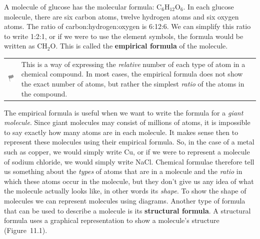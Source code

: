 \begin{enumerate}[noitemsep, label=\textbf{\arabic*}. ]
A molecule of glucose has the molecular formula:
${\mathrm{C}}_{6}{\mathrm{H}}_{12}{\mathrm{O}}_{6}$.
In each glucose molecule, there are six carbon atoms, twelve hydrogen atoms and 
six oxygen atoms. The ratio of carbon:hydrogen:oxygen is 6:12:6. We can simplify 
this ratio to write 1:2:1, or if we were to use the element symbols, the formula 
would be written as ${\mathrm{CH}}_{2}\mathrm{O}$. This is called the \textbf{empirical formula} of the molecule.
\vspace{\rubberspace}\par
        \label{m38120*fhsst!!!underscore!!!id93}\begin{definition}
	  \begin{tabular*}{15 cm}{m{15 mm}m{}}
	\hspace*{-50pt}  \includegraphics[width=0.5in]{col11305.imgs/psflag2.png}   & \Definition{   \label{id2456770}\textbf{ Empirical formula }} { \label{m38120*meaningfhsst!!!underscore!!!id93}
This is a way of expressing the \textsl{relative} 
number of each type of atom in a chemical compound. In most cases, the empirical 
formula does not show the exact number of atoms, but rather the simplest 
\textsl{ratio} of the atoms in the compound. 
 } 
      \end{tabular*}
      \end{definition}
The empirical formula is useful when we want to write the 
formula for a \textsl{giant molecule}. Since giant 
molecules may consist of millions of atoms, it is impossible to say exactly how 
many atoms are in each molecule. It makes sense then to represent these 
molecules using their empirical formula. So, in the case of a metal such as 
copper, we would simply write Cu, or if we were to represent a molecule of 
sodium chloride, we would simply write NaCl.
Chemical formulae therefore tell us something about the \textsl{types} of atoms that are in a molecule and the 
\textsl{ratio} in which these atoms occur in the 
molecule, but they don't give us any idea of what the molecule actually looks 
like, in other words its \textsl{shape}. To show 
the shape of molecules we can represent molecules using diagrams.
Another type of formula that can be used to describe a molecule is its \textbf{structural formula}. A structural formula uses a 
graphical representation to show a molecule's structure                    
(Figure~11.1).
    \setcounter{subfigure}{0}

\end{enumerate}
